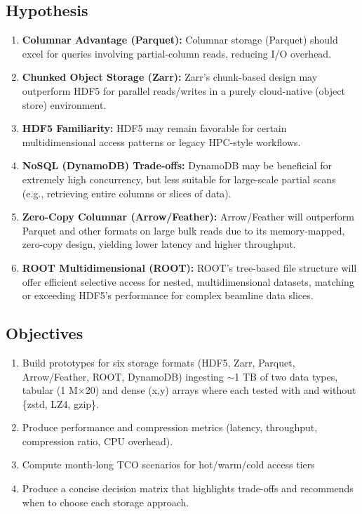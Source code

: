 \documentclass{article}
\begin{document}
\subsection{Hypothesis}
\begin{enumerate}
    \item \textbf{Columnar Advantage (Parquet):} Columnar storage (Parquet) should excel for queries involving partial-column reads, reducing I/O overhead.
    \item \textbf{Chunked Object Storage (Zarr):} Zarr’s chunk-based design may outperform HDF5 for parallel reads/writes in a purely cloud-native (object store) environment.
    \item \textbf{HDF5 Familiarity:} HDF5 may remain favorable for certain multidimensional access patterns or legacy HPC-style workflows.
    \item \textbf{NoSQL (DynamoDB) Trade-offs:} DynamoDB may be beneficial for extremely high concurrency, but less suitable for large-scale partial scans (e.g., retrieving entire columns or slices of data).
    \item \textbf{Zero-Copy Columnar (Arrow/Feather):} Arrow/Feather will outperform Parquet and other formats on large bulk reads due to its memory-mapped, zero-copy design, yielding lower latency and higher throughput.
    \item \textbf{ROOT Multidimensional (ROOT):} ROOT’s tree-based file structure will offer efficient selective access for nested, multidimensional datasets, matching or exceeding HDF5’s performance for complex beamline data slices.

\end{enumerate}

\subsection{Objectives}
\begin{enumerate}
    \item Build prototypes for six storage formats (HDF5, Zarr, Parquet, Arrow/Feather, ROOT, DynamoDB) ingesting $\sim$1 TB of two data types, tabular (1 M×20) and dense (x,y) arrays where each tested with and without \{zstd, LZ4, gzip\}.
    \item Produce performance and compression metrics (latency, throughput, compression ratio, CPU overhead).
    \item Compute month-long TCO scenarios for hot/warm/cold access tiers
    \item Produce a concise decision matrix that highlights trade-offs and recommends when to choose each storage approach.
\end{enumerate}
\end{document}
